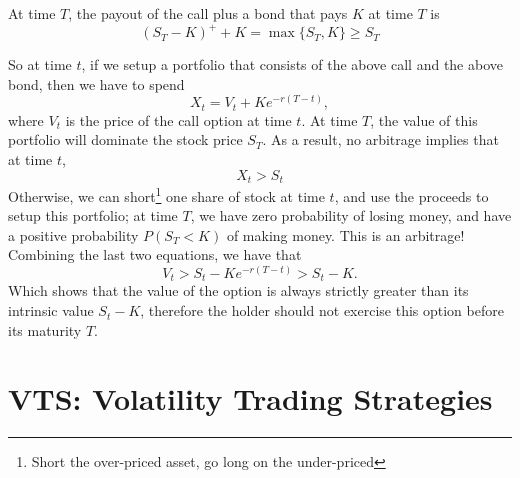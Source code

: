\documentclass{amsart}
\theoremstyle{plain}
\numberwithin{equation}{section}
\begin{document}
At time $T$, the payout of the call plus a bond that
pays $K$ at time $T$ is
\begin{equation*}
(S_T - K )^{+} + K = \max\{S_T, K\} \geq S_T
\end{equation*}

So at time $t$, if we setup a portfolio that consists of the above call 
and the above bond, then we have to spend
\begin{equation*}
X_t = V_t + Ke^{-r(T-t)},
\end{equation*}
where $V_t$ is the price of the call option at time $t$. 
At time $T$, the value of this portfolio will dominate the stock
price $S_T$. As a result, no arbitrage implies that at time $t$,
\begin{equation*}
X_t > S_t
\end{equation*}
Otherwise, we can short\footnote{Short the over-priced asset, go long on the 
under-priced} one share of stock at time $t$, and use the proceeds to setup this portfolio;
at time $T$, we have zero probability of losing money, and have a positive probability $P(S_T < K)$ of making
money. This is an arbitrage!
Combining the last two equations, we have that
\begin{equation*}
V_t > S_t - Ke^{-r(T-t)} 
> S_t - K.
\end{equation*}
Which shows that the value of the option is always strictly greater than its 
intrinsic value $S_t - K$, therefore
the holder should not exercise this option before its maturity $T$.

\section{VTS: Volatility Trading Strategies}
\end{document}
